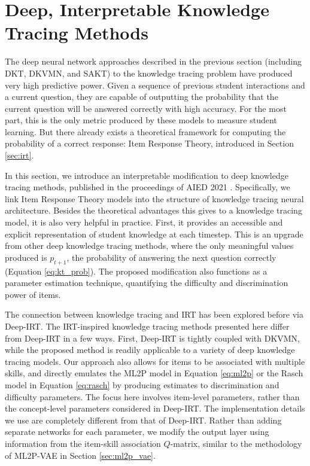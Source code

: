 \chapter{Deep, Interpretable Knowledge Tracing Methods} \label{ch:kt_methods}

The deep neural network approaches described in the previous section (including DKT, DKVMN, and SAKT) to the knowledge tracing problem have produced very high predictive power. Given a sequence of previous student interactions and a current question, they are capable of outputting the probability that the current question will be answered correctly with high accuracy. For the most part, this is the only metric produced by these models to measure student learning. But there already exists a theoretical framework for computing the probability of a correct response: Item Response Theory, introduced in Section \ref{sec:irt}.

In this section, we introduce an interpretable modification to deep knowledge tracing methods, published in the proceedings of AIED 2021 \cite{kt_irt}. Specifically, we link Item Response Theory models into the structure of knowledge tracing neural architecture. Besides the theoretical advantages this gives to a knowledge tracing model, it is also very helpful in practice. First, it provides an accessible and explicit representation of student knowledge at each timestep. This is an upgrade from other deep knowledge tracing methods, where the only meaningful values produced is $p_{t+1}$, the probability of answering the next question correctly (Equation \ref{eq:kt_prob}). The proposed modification also functions as a parameter estimation technique, quantifying the difficulty and discrimination power of items.

The connection between knowledge tracing and IRT has been explored before via Deep-IRT. The IRT-inspired knowledge tracing methods presented here differ from Deep-IRT in a few ways. First, Deep-IRT is tightly coupled with DKVMN, while the proposed method is readily applicable to a variety of deep knowledge tracing models. Our approach also allows for items to be associated with multiple skills, and directly emulates the ML2P model in Equation \ref{eq:ml2p} or the Rasch model in Equation \ref{eq:rasch} by producing estimates to discrimination and difficulty parameters. The focus here involves item-level parameters, rather than the concept-level parameters considered in Deep-IRT. The implementation details we use are completely different from that of Deep-IRT. Rather than adding separate networks for each parameter, we modify the output layer using information from the item-skill association $Q$-matrix, similar to the methodology of ML2P-VAE in Section \ref{sec:ml2p_vae}.

